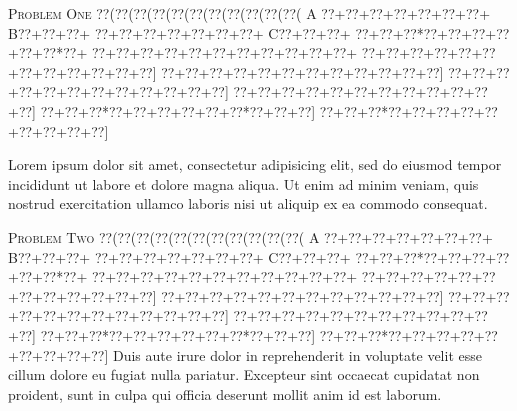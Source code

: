 \documentclass[a5paper]{article}
\begin{document}
\vspace*{\fill}
\begin{minipage}{\textwidth}
\begin{center}
\textsc{Problem One}
{\bgoo
\0??(\0??(\0??(\0??(\0??(\0??(\0??(\0??(\0??(\0??(\0??(\!  A
\0??+\0??+\0??+\0??+\0??+\0??+\0??+\!  B\0??+\0??+\0??+
\0??+\0??+\0??+\0??+\0??+\0??+\0??+\!  C\0??+\0??+\0??+
\0??+\0??+\0??*\0??+\0??+\0??+\0??+\0??+\0??*\0??+
\0??+\0??+\0??+\0??+\0??+\0??+\0??+\0??+\0??+\0??+\0??+
\0??+\0??+\0??+\0??+\0??+\0??+\0??+\0??+\0??+\0??+\0??+\0??]
\0??+\0??+\0??+\0??+\0??+\0??+\0??+\0??+\0??+\0??+\0??+\0??]
\0??+\0??+\0??+\0??+\0??+\0??+\0??+\0??+\0??+\0??+\0??+\0??]
\0??+\0??+\0??+\0??+\0??+\0??+\0??+\0??+\0??+\0??+\0??+\0??]
\0??+\0??+\0??*\0??+\0??+\0??+\0??+\0??+\0??*\0??+\0??+\0??]
\0??+\0??+\0??*\0??+\0??+\0??+\0??+\0??+\0??+\0??+\0??+\0??]
}

Lorem ipsum dolor sit amet, consectetur adipisicing elit, sed do eiusmod tempor
incididunt ut labore et dolore magna aliqua. Ut enim ad minim veniam, quis
nostrud exercitation ullamco laboris nisi ut aliquip ex ea commodo consequat.

\vspace{2em}

\textsc{Problem Two}
{\bgoo
\0??(\0??(\0??(\0??(\0??(\0??(\0??(\0??(\0??(\0??(\0??(\!  A
\0??+\0??+\0??+\0??+\0??+\0??+\0??+\!  B\0??+\0??+\0??+
\0??+\0??+\0??+\0??+\0??+\0??+\0??+\!  C\0??+\0??+\0??+
\0??+\0??+\0??*\0??+\0??+\0??+\0??+\0??+\0??*\0??+
\0??+\0??+\0??+\0??+\0??+\0??+\0??+\0??+\0??+\0??+\0??+
\0??+\0??+\0??+\0??+\0??+\0??+\0??+\0??+\0??+\0??+\0??+\0??]
\0??+\0??+\0??+\0??+\0??+\0??+\0??+\0??+\0??+\0??+\0??+\0??]
\0??+\0??+\0??+\0??+\0??+\0??+\0??+\0??+\0??+\0??+\0??+\0??]
\0??+\0??+\0??+\0??+\0??+\0??+\0??+\0??+\0??+\0??+\0??+\0??]
\0??+\0??+\0??*\0??+\0??+\0??+\0??+\0??+\0??*\0??+\0??+\0??]
\0??+\0??+\0??*\0??+\0??+\0??+\0??+\0??+\0??+\0??+\0??+\0??]
}
Duis aute irure dolor in reprehenderit in voluptate velit esse cillum dolore eu
fugiat nulla pariatur. Excepteur sint occaecat cupidatat non proident, sunt in
culpa qui officia deserunt mollit anim id est laborum.
\end{center}
\end{minipage}
\vfill %
\clearpage

\newpage
\end{document}
